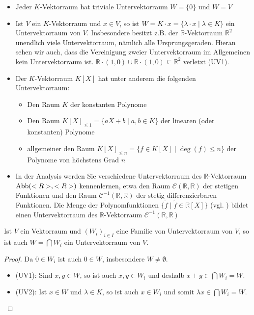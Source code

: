 \begin{example}
	\begin{itemize}
		\item Jeder $K$-Vektorraum hat triviale Untervektorraum $W=\{0\}$ und $W=V$
		\item Ist $V$ ein $K$-Vektorraum und $x \in V$, so ist $W=K\cdot x=\{\lambda\cdot x \mid \lambda \in K\}$ ein Untervektorraum von $V$. 
		Insbesondere besitzt z.B. der $\mathbb R$-Vektorraum $\mathbb R^2$ unendlich viele Untervektorraum, nämlich alle Ursprungsgeraden. Hieran 
		sehen wir auch, dass die Vereinigung zweier Untervektorraum im Allgemeinen kein Untervektorraum ist. $\mathbb R\cdot (1,0) \cup \mathbb 
		R\cdot (1,0) \subseteq \mathbb R^2$ verletzt (UV1).
		\item Der $K$-Vektorraum $K[X]$ hat unter anderem die folgenden Untervektorraum:
		\begin{itemize}
			\item Den Raum $K$ der konstanten Polynome
			\item Den Raum $K[X]_{\le 1}=\{aX+b \mid a,b \in K\}$ der linearen (oder konstanten) Polynome
			\item allgemeiner den Raum $K[X]_{\le n}=\{f \in K[X] \mid \deg(f) \le n\}$ der Polynome von höchstens Grad $n$
		\end{itemize}
		\item In der Analysis werden Sie verschiedene Untervektorraum des $\mathbb R$-Vektorraum $\operatorname{Abb}(<R>,<R>)$ kennenlernen, etwa
		den Raum $\mathcal C(\mathbb R,\mathbb R)$ der stetigen Funktionen und den Raum $\mathcal C^{-1}(\mathbb R,\mathbb 
		R)$ der stetig differenzierbaren Funktionen. Die Menge der Polynomfunktionen $\{\tilde f\mid \tilde f\in \mathbb R[X]\}$ (vgl. ) bildet
		einen Untervektorraum des $\mathbb R$-Vektorraum $\mathcal C^{-1}(\mathbb R,\mathbb R)$
	\end{itemize}
\end{example}


\begin{lemma}
	Ist $V$ ein Vektorraum und $(W_i)_{i \in I}$ eine Familie von Untervektorraum von $V$, so ist auch $W=\bigcap W_i$ 
	ein Untervektorraum von $V$.
\end{lemma}
\begin{proof}
	Da $0 \in W_i$ ist auch $0 \in W$, insbesondere $W\neq\emptyset$.
	\begin{itemize}
		\item (UV1): Sind $x,y \in W$, so ist auch $x,y \in W_i$ und deshalb $x+y\in \bigcap W_i = W$.
		\item (UV2): Ist $x \in W$ und $\lambda \in K$, so ist auch $x \in W_i$ und somit $\lambda x\in \bigcap W_i=W$.
	\end{itemize}
\end{proof}

